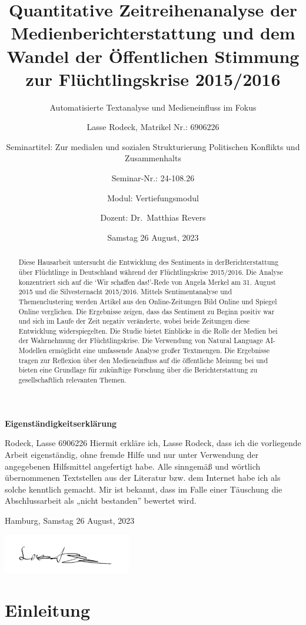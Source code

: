 \documentclass[
  11pt,
]{article}
\title{Quantitative Zeitreihenanalyse der Medienberichterstattung und
dem Wandel der Öffentlichen Stimmung zur Flüchtlingskrise 2015/2016}
\subtitle{Automatisierte Textanalyse und Medieneinfluss im Fokus}
\author{Lasse Rodeck, Matrikel Nr.: 6906226 \and Seminartitel: Zur
medialen und sozialen Strukturierung Politischen Konflikts und
Zusammenhalts \and Seminar‐Nr.: 24-108.26 \and Modul:
Vertiefungsmodul \and Dozent: Dr.~Matthias Revers}
\date{Samstag 26 August, 2023}
\begin{document}
\maketitle
\begin{abstract}
Diese Hausarbeit untersucht die Entwicklung des Sentiments in
derBerichterstattung über Flüchtlinge in Deutschland während der
Flüchtlingskrise 2015/2016. Die Analyse konzentriert sich auf die `Wir
schaffen das!'-Rede von Angela Merkel am 31. August 2015 und die
Silvesternacht 2015/2016. Mittels Sentimentanalyse und Themenclustering
werden Artikel aus den Online-Zeitungen Bild Online und Spiegel Online
verglichen. Die Ergebnisse zeigen, dass das Sentiment zu Beginn positiv
war und sich im Laufe der Zeit negativ veränderte, wobei beide Zeitungen
diese Entwicklung widerspiegelten. Die Studie bietet Einblicke in die
Rolle der Medien bei der Wahrnehmung der Flüchtlingskrise. Die
Verwendung von Natural Language AI-Modellen ermöglicht eine umfassende
Analyse großer Textmengen. Die Ergebnisse tragen zur Reflexion über den
Medieneinfluss auf die öffentliche Meinung bei und bieten eine Grundlage
für zukünftige Forschung über die Berichterstattung zu gesellschaftlich
relevanten Themen.
\end{abstract}

\renewcommand*\contentsname{Inhaltsverzeichnis}
{
\setcounter{tocdepth}{2}
\tableofcontents
}
\listoffigures
\listoftables
{}
\textbf{Eigenständigkeitserklärung}

Rodeck, Lasse 6906226 Hiermit erkläre ich, Lasse Rodeck, dass ich die
vorliegende Arbeit eigenständig, ohne fremde Hilfe und nur unter
Verwendung der angegebenen Hilfsmittel angefertigt habe. Alle sinngemäß
und wörtlich übernommenen Textstellen aus der Literatur bzw. dem
Internet habe ich als solche kenntlich gemacht. Mir ist bekannt, dass im
Falle einer Täuschung die Abschlussarbeit als „nicht bestanden''
bewertet wird.

Hamburg, Samstag 26 August, 2023

\includegraphics[width=2.19792in,height=\textheight]{images/Signature Digital.png}

\pagebreak

\hypertarget{einleitung}{%
\section{Einleitung}\label{einleitung}}
\end{document}
